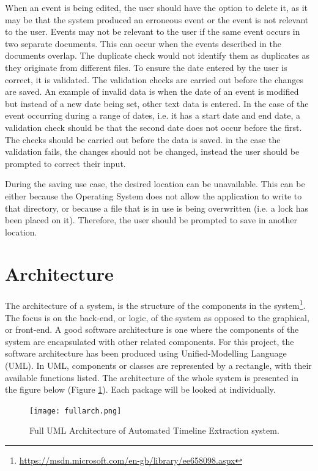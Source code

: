 \par When an event is being edited, the user should have the option to delete it, as it may be that the system produced an erroneous event or the event is not relevant to the user. Events may not be relevant to the user if the same event occurs in two separate documents. This can occur when the events described in the documents overlap. The duplicate check would not identify them as duplicates as they originate from different files. To ensure the date entered by the user is correct, it is validated. The validation checks are carried out before the changes are saved. An example of invalid data is when the date of an event is modified but instead of a new date being set, other text data is entered. In the case of the event occurring during a range of dates, i.e. it has a start date and end date, a validation check should be that the second date does not occur before the first. The checks should be carried out before the data is saved. in the case the validation fails, the changes should not be changed, instead the user should be prompted to correct their input.
\par During the saving use case, the desired location can be unavailable. This can be either because the Operating System does not allow the application to write to that directory, or because a file that is in use is being overwritten (i.e. a lock has been placed on it). Therefore, the user should be prompted to save in another location.

\section{Architecture}
\par The architecture of a system, is the structure of the components in the system\footnote{\url{https://msdn.microsoft.com/en-gb/library/ee658098.aspx}}. The focus is on the back-end, or logic, of the system as opposed to the graphical, or front-end. A good software architecture is one where the components of the system are encapsulated with other related components. For this project, the software architecture has been produced using Unified-Modelling Language (UML). In UML, components or classes are represented by a rectangle, with their available functions listed. The architecture of the whole system is presented in the figure below (Figure \ref{fig:fullArch}). Each package will be looked at individually.
\begin{figure}[H]
\caption{Full UML Architecture of Automated Timeline Extraction system.}
\label{fig:fullArch}
\texttt{[image: fullarch.png]}
\centering
\end{figure}
